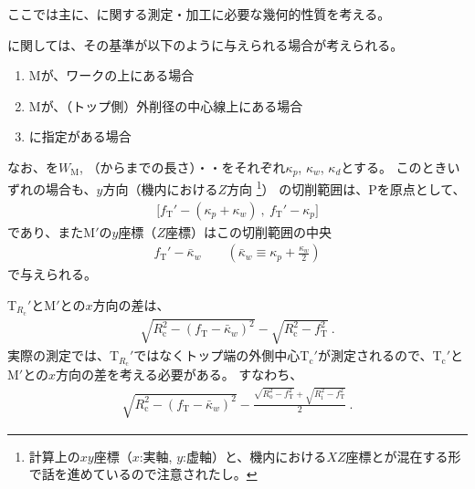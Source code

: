 

ここでは主に、\textbf{\Keyway}に関する測定・加工に必要な幾何的性質を考える。



\textbf{\Keyway}に関しては、その基準が以下のように与えられる場合が考えられる。
\begin{enumerate}[label=\sarrow]
\item \KeywayCenter Mが、ワークの\CenterCurvatureLine 上にある場合
\item \KeywayCenter Mが、（トップ側）外削径の中心線上にある場合
\item \AsideKeywayDepth に指定がある場合
\end{enumerate}
なお、\KeywayDiameter を$W_\mathrm M$, \KeywayPos（\EndFace から\Keyway までの長さ）・\KeywayWidth・\AsideKeywayDepth をそれぞれ$\kappa_p$, $\kappa_w$, $\kappa_d$とする。
このときいずれの場合も、$y$方向（機内における$Z$方向
\footnote{計算上の$xy$座標（$x$:実軸, $y$:虚軸）と、機内における$XZ$座標とが混在する形で話を進めているので注意されたし。}）
の切削範囲は、\TableCenter Pを原点として、
\begin{align*}
  \big[f_\mathrm T'-(\kappa_p+\kappa_w)\ ,\ f_\mathrm T'-\kappa_p\big]
\end{align*}
であり、また\KeywayCenter M$'$の$y$座標（$Z$座標）はこの切削範囲の中央
\begin{align}
  \label{eq:mizocenterZ}
  f_\mathrm T'-\bar\kappa_w \qquad
  \left(\bar\kappa_w \equiv \kappa_p+\frac{\kappa_w}2\right)
\end{align}
で与えられる。



\clearpage
\TopCurvatureCenter T$_{R_\mathrm c}'$と\KeywayCenter M$'$との$x$方向の差は、
\begin{align*}
  \sqrt{R_\mathrm c^2-\left(f_\mathrm T-\bar\kappa_w\right)^2}
  -\sqrt{R_\mathrm c^2-f_\mathrm T^2}\ .
\end{align*}
実際の測定では、\TopCurvatureCenter T$_{R_\mathrm c}'$ではなくトップ端の外側中心T$_\mathrm c'$が測定されるので、T$_\mathrm c'$とM$'$との$x$方向の差を考える必要がある。
すなわち、
\begin{align}
  \label{eq:difTopKeywayCenter}
  \sqrt{R_\mathrm c^2-\left(f_\mathrm T-\bar\kappa_w\right)^2}
  -\frac{\sqrt{R_\mathrm o^2-f_\mathrm T^2}+\sqrt{R_\mathrm i^2-f_\mathrm T^2}}2\ .
\end{align}


